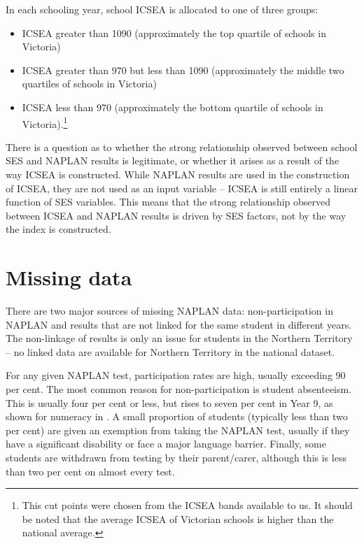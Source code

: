 In each schooling year, school ICSEA is allocated to one of three groups:
\begin{itemize}
\item ICSEA greater than 1090 (approximately the top quartile of schools in Victoria)
\item ICSEA greater than 970 but less than 1090 (approximately the middle two quartiles of schools in Victoria) 
\item ICSEA less than 970 (approximately the bottom quartile of schools in Victoria).\footnote{This cut points were chosen from the ICSEA bands available to us. It should be noted that the average ICSEA of Victorian schools is higher than the national average.}
\end{itemize}

There is a question as to whether the strong relationship observed between school SES and NAPLAN results is legitimate, or whether it arises as a result of the way ICSEA is constructed. While NAPLAN results are used in the construction of ICSEA, they are not used as an input variable -- ICSEA is still entirely a linear function of SES variables. This means that the strong relationship observed between ICSEA and NAPLAN results is driven by SES factors, not by the way the index is constructed.

\section{Missing data} \label{sec:missing}

There are two major sources of missing NAPLAN data: non-participation in NAPLAN and results that are not linked for the same student in different years. The non-linkage of results is only an issue for students in the Northern Territory -- no linked data are available for Northern Territory in the national dataset.

For any given NAPLAN test, participation rates are high, usually exceeding 90 per cent. The most common reason for non-participation is student absenteeism. This is usually four per cent or less, but rises to seven per cent in Year 9, as shown for numeracy in . A small proportion of students (typically less than two per cent) are given an exemption from taking the NAPLAN test, usually if they have a significant disability or face a major language barrier. Finally, some students are withdrawn from testing by their parent/carer, although this is less than two per cent on almost every test.

